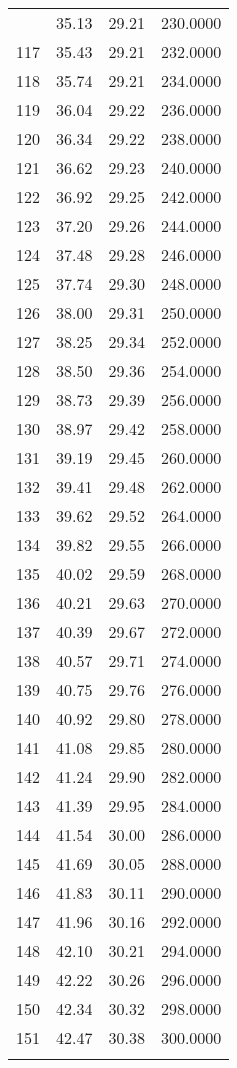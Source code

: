 \documentclass[
  captions=tableheading,
]{scrartcl}
\begin{document}
\begin{longtable} {l|l|l|l}
{116 &	35.13 &	29.21 &	230.0000\\
117 &	35.43 &	29.21 &	232.0000\\
118 &	35.74 &	29.21 &	234.0000\\
119 &	36.04 &	29.22 &	236.0000\\
120 &	36.34 &	29.22 &	238.0000\\
121 &	36.62 &	29.23 &	240.0000\\
122 &	36.92 &	29.25 &	242.0000\\
123 &	37.20 &	29.26 &	244.0000\\
124 &	37.48 &	29.28 &	246.0000\\
125 &	37.74 &	29.30 &	248.0000\\
126 &	38.00 &	29.31 &	250.0000\\
127 &	38.25 &	29.34 &	252.0000\\
128 &	38.50 &	29.36 &	254.0000\\
129 &	38.73 &	29.39 &	256.0000\\
130 &	38.97 &	29.42 &	258.0000\\
131 &	39.19 &	29.45 &	260.0000\\
132 &	39.41 &	29.48 &	262.0000\\
133 &	39.62 &	29.52 &	264.0000\\
134 &	39.82 &	29.55 &	266.0000\\
135 &	40.02 &	29.59 &	268.0000\\
136 &	40.21 &	29.63 &	270.0000\\
137 &	40.39 &	29.67 &	272.0000\\
138 &	40.57 &	29.71 &	274.0000\\
139 &	40.75 &	29.76 &	276.0000\\
140 &	40.92 &	29.80 &	278.0000\\
141 &	41.08 &	29.85 &	280.0000\\
142 &	41.24 &	29.90 &	282.0000\\
143 &	41.39 &	29.95 &	284.0000\\
144 &	41.54 &	30.00 &	286.0000\\
145 &	41.69 &	30.05 &	288.0000\\
146 &	41.83 &	30.11 &	290.0000\\
147 &	41.96 &	30.16 &	292.0000\\
148 &	42.10 &	30.21 &	294.0000\\
149 &	42.22 &	30.26 &	296.0000\\
150 &	42.34 &	30.32 &	298.0000\\
151 &	42.47 &	30.38 &	300.0000\\
}
\end{longtable}
\end{document}
